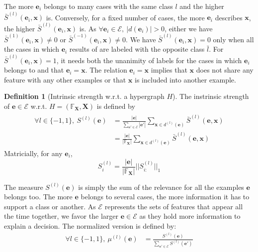 \documentclass[preprint,12pt]{elsarticle}
\theoremstyle{definition}
\newtheorem{definition}{Definition}[section]
\begin{document}
The more $\mathbf e_i$ belongs to many cases with the same class $l$ and the higher $\bar S^{(l)}(\mathbf e_i, \mathbf x)$ is. Conversely, for a fixed number of cases, the more $\mathbf e_i$ describes $\mathbf x$, the higher $\bar S^{(l)}(\mathbf e_i, \mathbf x)$ is. As $\forall \mathbf e_i \in \mathcal E, ~ |d(\mathbf e_i)| > 0$, either we have $\bar S^{(1)}(\mathbf e_i, \mathbf x) \neq 0$ or $\bar S^{(-1)}(\mathbf e_i, \mathbf x) \neq 0$. We have $\bar S^{(l)}(\mathbf e_i, \mathbf x) = 0$ only when all the cases in which $\mathbf e_i$ results of are labeled with the opposite class $\bar l$. For $\bar S^{(l)}(\mathbf e_i, \mathbf x) = 1$, it needs both the unanimity of labels for the cases in which $\mathbf e_i$ belongs to and that $\mathbf e_i = \mathbf x$. The relation $\mathbf e_i = \mathbf x$ implies that $\mathbf x$ does not share any feature with any other examples or that $\mathbf x$ is included into another example.
\begin{definition}[Intrinsic strength w.r.t. a hypergraph $H$]
  \label{intrinsic_strength}
  The instrinsic strength of $\mathbf e \in \mathcal{E}$ w.r.t. $H = (\mathbb{F}_{\mathbf X}, \mathbf X)$ is defined by
  \begin{align}
  \begin{split}
  \forall l \in \{ -1,  1 \}, ~ S^{(l)}(\mathbf e) & = \frac{|\mathbf e|}{ \underset{\mathbf e' \in \mathcal{E}}{\sum} |\mathbf e'|} \underset{\mathbf x \in d^{(l)}(\mathbf e)}{\sum} \bar S^{(l)}(\mathbf e, \mathbf x) \\
  & = \frac{|\mathbf e|}{|\mathbb{F}_{\mathbf X}|} \underset{\mathbf x \in d^{(l)}(\mathbf e)}{\sum} \bar S^{(l)}(\mathbf e, \mathbf x)
   \end{split}
  \end{align} 
  Matricially, for any $\mathbf e_i$,
  \begin{equation}
   S^{(l)}_{i} = \frac{|\mathbf e|}{|\mathbb{F}_{\mathbf X}|} ||S^{(l)}_{i:}||_1
  \end{equation}

  The measure $S^{(l)}(\mathbf e)$ is simply the sum of the relevance for all the examples $\mathbf e$ belongs too. The more $\mathbf e$ belongs to several cases, the more information it has to support a class or another. As $\mathcal E$ represents the sets of features that appear all the time together, we favor the larger $\mathbf e \in \mathcal E$ as they hold more information to explain a decision.
  The normalized version is defined by:
    \begin{align}
  \forall l \in \{ -1, 1 \},~ \mu^{(l)}(\mathbf e) & = \frac{S^{(l)}(\mathbf e)}{ \underset{\mathbf e' \in \mathcal{E}}{\sum} S^{(l)}(\mathbf e')}
  \end{align}
\end{definition} 
\end{document}
